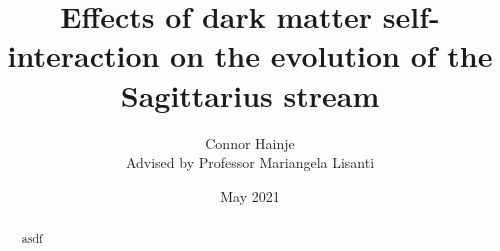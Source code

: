 \documentclass{report}
\title{Effects of dark matter self-interaction on the evolution of the Sagittarius stream}
\author{Connor Hainje\\Advised by Professor Mariangela Lisanti}
\date{May 2021}
\begin{document}
\maketitle

\begin{abstract}
    asdf
\end{abstract}

\tableofcontents 

\newpage



\end{document}
